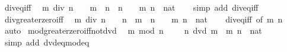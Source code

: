 \begin{isabellebody}
\ div{\isacharunderscore}{\kern0pt}eq{\isacharunderscore}{\kern0pt}{}{\isacharunderscore}{\kern0pt}iff{\isacharcolon}{\kern0pt}\isanewline
\ \ {\isachardoublequoteopen}m\ div\ n\ {\isacharequal}{\kern0pt}\ {}\ {\isasymlongleftrightarrow}\ m\ {\isacharless}{\kern0pt}\ n\ {\isasymor}\ n\ {\isacharequal}{\kern0pt}\ {}{\isachardoublequoteclose}\ \ m\ n\ {\isacharcolon}{\kern0pt}{\isacharcolon}{\kern0pt}\ nat\isanewline
%
\isadelimproof
\ \ %
\endisadelimproof
%
\isatagproof
{}\isamarkupfalse%
\ {\isacharparenleft}{\kern0pt}simp\ add{\isacharcolon}{\kern0pt}\ div{\isacharunderscore}{\kern0pt}eq{\isacharunderscore}{\kern0pt}{}{\isacharunderscore}{\kern0pt}iff{\isacharparenright}{\kern0pt}%
\endisatagproof
{\isafoldproof}%
%
\isadelimproof
\isanewline
%
\endisadelimproof
\isanewline
{}\isamarkupfalse%
\ div{\isacharunderscore}{\kern0pt}greater{\isacharunderscore}{\kern0pt}zero{\isacharunderscore}{\kern0pt}iff{\isacharcolon}{\kern0pt}\isanewline
\ \ {\isachardoublequoteopen}m\ div\ n\ {\isachargreater}{\kern0pt}\ {}\ {\isasymlongleftrightarrow}\ n\ {\isasymle}\ m\ {\isasymand}\ n\ {\isachargreater}{\kern0pt}\ {}{\isachardoublequoteclose}\ \ m\ n\ {\isacharcolon}{\kern0pt}{\isacharcolon}{\kern0pt}\ nat\isanewline
%
\isadelimproof
\ \ %
\endisadelimproof
%
\isatagproof
{}\isamarkupfalse%
\ div{\isacharunderscore}{\kern0pt}eq{\isacharunderscore}{\kern0pt}{}{\isacharunderscore}{\kern0pt}iff\ {\isacharbrackleft}{\kern0pt}of\ m\ n{\isacharbrackright}{\kern0pt}\ \isamarkupfalse%
\ auto%
\endisatagproof
{\isafoldproof}%
%
\isadelimproof
\isanewline
%
\endisadelimproof
\isanewline
{}\isamarkupfalse%
\ mod{\isacharunderscore}{\kern0pt}greater{\isacharunderscore}{\kern0pt}zero{\isacharunderscore}{\kern0pt}iff{\isacharunderscore}{\kern0pt}not{\isacharunderscore}{\kern0pt}dvd{\isacharcolon}{\kern0pt}\isanewline
\ \ {\isachardoublequoteopen}m\ mod\ n\ {\isachargreater}{\kern0pt}\ {}\ {\isasymlongleftrightarrow}\ {\isasymnot}\ n\ dvd\ m{\isachardoublequoteclose}\ \ m\ n\ {\isacharcolon}{\kern0pt}{\isacharcolon}{\kern0pt}\ nat\isanewline
%
\isadelimproof
\ \ %
\endisadelimproof
%
\isatagproof
{}\isamarkupfalse%
\ {\isacharparenleft}{\kern0pt}simp\ add{\isacharcolon}{\kern0pt}\ dvd{\isacharunderscore}{\kern0pt}eq{\isacharunderscore}{\kern0pt}mod{\isacharunderscore}{\kern0pt}eq{\isacharunderscore}{\kern0pt}{}{\isacharparenright}{\kern0pt}%

\end{isabellebody}
